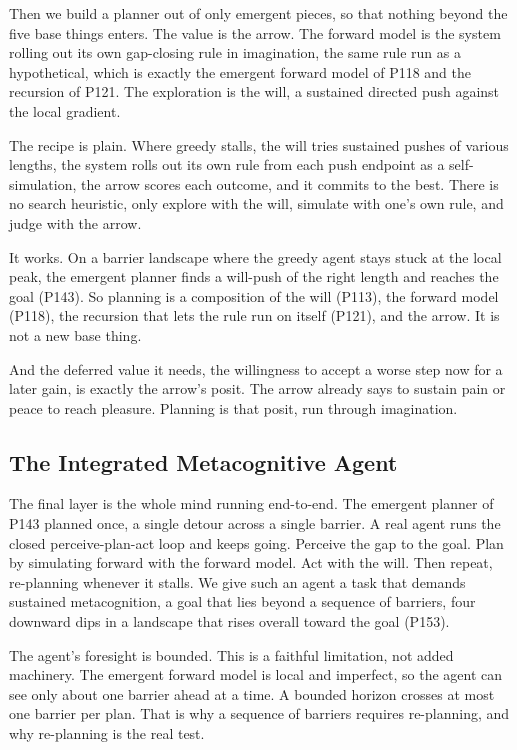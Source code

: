 Then we build a planner out of only emergent pieces, so that nothing beyond the five base things enters. The value is the arrow. The forward model is the system rolling out its own gap-closing rule in imagination, the same rule run as a hypothetical, which is exactly the emergent forward model of P118 and the recursion of P121. The exploration is the will, a sustained directed push against the local gradient.

The recipe is plain. Where greedy stalls, the will tries sustained pushes of various lengths, the system rolls out its own rule from each push endpoint as a self-simulation, the arrow scores each outcome, and it commits to the best. There is no search heuristic, only explore with the will, simulate with one's own rule, and judge with the arrow.

It works. On a barrier landscape where the greedy agent stays stuck at the local peak, the emergent planner finds a will-push of the right length and reaches the goal (P143). So planning is a composition of the will (P113), the forward model (P118), the recursion that lets the rule run on itself (P121), and the arrow. It is not a new base thing.

And the deferred value it needs, the willingness to accept a worse step now for a later gain, is exactly the arrow's posit. The arrow already says to sustain pain or peace to reach pleasure. Planning is that posit, run through imagination.

\subsection{The Integrated Metacognitive Agent}

The final layer is the whole mind running end-to-end. The emergent planner of P143 planned once, a single detour across a single barrier. A real agent runs the closed perceive-plan-act loop and keeps going. Perceive the gap to the goal. Plan by simulating forward with the forward model. Act with the will. Then repeat, re-planning whenever it stalls. We give such an agent a task that demands sustained metacognition, a goal that lies beyond a sequence of barriers, four downward dips in a landscape that rises overall toward the goal (P153).

The agent's foresight is bounded. This is a faithful limitation, not added machinery. The emergent forward model is local and imperfect, so the agent can see only about one barrier ahead at a time. A bounded horizon crosses at most one barrier per plan. That is why a sequence of barriers requires re-planning, and why re-planning is the real test.

